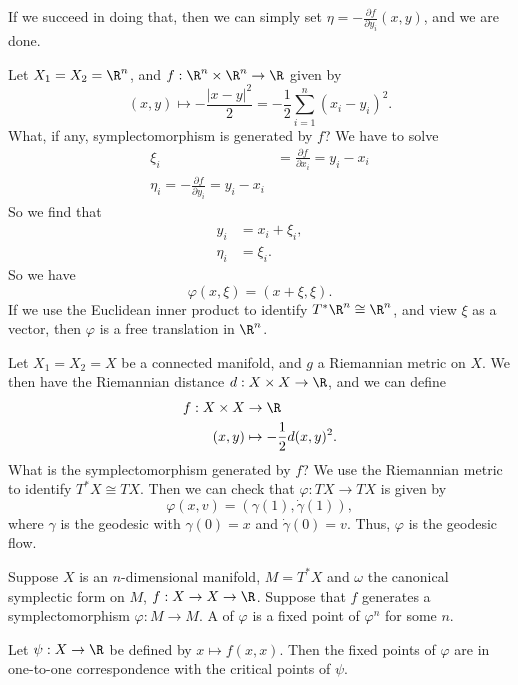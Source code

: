 \documentclass[a4paper]{article}
\begin{document}
If we succeed in doing that, then we can simply set $\eta = - \frac{\partial f}{\partial y_i} (x, y)$, and we are done.

\begin{eg}
  Let $X_1 = X_2 = \R^n$, and $f: \R^n \times \R^n \to \R$ given by
  \[
    (x, y) \mapsto - \frac{|x - y|^2}{2} = -\frac{1}{2} \sum_{i = 1}^n (x_i - y_i)^2.
  \]
  What, if any, symplectomorphism is generated by $f$? We have to solve
  \begin{align*}
    \xi_i &= \frac{\partial f}{\partial x_i} = y_i - x_i\\
    \eta_i = -\frac{\partial f}{\partial y_i} = y_i - x_i
  \end{align*}
  So we find that
  \begin{align*}
    y_i &= x_i + \xi_i,\\
    \eta_i &= \xi_i.
  \end{align*}
  So we have
  \[
    \varphi(x, \xi) = (x + \xi, \xi).
  \]
  If we use the Euclidean inner product to identify $T^* \R^n \cong \R^n$, and view $\xi$ as a vector, then $\varphi$ is a free translation in $\R^n$.
\end{eg}

\begin{eg}
  Let $X_1 = X_2 = X$ be a connected manifold, and $g$ a Riemannian metric on $X$. We then have the Riemannian distance $d: X \times X \to \R$, and we can define
  \begin{align*}
    f: X \times X &\to \R\\
    (x, y) &\mapsto - \frac{1}{2} d(x, y)^2.
  \end{align*}
  What is the symplectomorphism generated by $f$? We use the Riemannian metric to identify $T^*X \cong TX$. Then we can check that $\varphi: TX \to TX$ is given by
  \[
    \varphi(x, v) = (\gamma(1), \dot{\gamma}(1)),
  \]
  where $\gamma$ is the geodesic with $\gamma(0) = x$ and $\dot{\gamma}(0) = v$. Thus, $\varphi$ is the geodesic flow.
\end{eg}

Suppose $X$ is an $n$-dimensional manifold, $M = T^*X$ and $\omega$ the canonical symplectic form on $M$, $f: X \to X \to \R$. Suppose that $f$ generates a symplectomorphism $\varphi: M \to M$. A  of $\varphi$ is a fixed point of $\varphi^n$ for some $n$.

\begin{prop}
  Let $\psi: X \to \R$ be defined by $x \mapsto f(x, x)$. Then the fixed points of $\varphi$ are in one-to-one correspondence with the critical points of $\psi$.
\end{prop}
\end{document}
